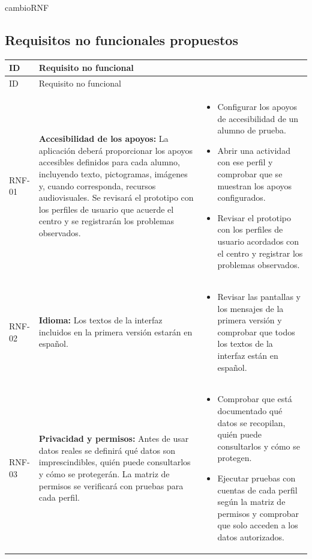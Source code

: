 \begin{cambiocontenido}{cambioRNF}
\subsection{Requisitos no funcionales propuestos}
\begingroup
\small
\begin{longtable}{|>{\raggedright\arraybackslash}p{1.4cm}|>{\raggedright\arraybackslash}p{5.5cm}|>{\raggedright\arraybackslash}p{7.8cm}|}
\hline
\rowcolor{tableHeader}
ID & Requisito no funcional & \multicolumn{1}{|>{\raggedright\arraybackslash}p{7.8cm}|}{Criterio de aceptación} \\
\hline
\endfirsthead
\rowcolor{tableHeader}
ID & Requisito no funcional & \multicolumn{1}{|>{\raggedright\arraybackslash}p{7.8cm}|}{Criterio de aceptación} \\
\hline
\endhead
\hypertarget{rnf-01}{}RNF-01 & \textbf{Accesibilidad de los apoyos:} La aplicación deberá proporcionar los apoyos accesibles definidos para cada alumno, incluyendo texto, pictogramas, imágenes y, cuando corresponda, recursos audiovisuales. Se revisará el prototipo con los perfiles de usuario que acuerde el centro y se registrarán los problemas observados. & \begin{itemize}[nosep,leftmargin=*]\item Configurar los apoyos de accesibilidad de un alumno de prueba. \item Abrir una actividad con ese perfil y comprobar que se muestran los apoyos configurados. \item Revisar el prototipo con los perfiles de usuario acordados con el centro y registrar los problemas observados.\end{itemize} \\
\hline
\hypertarget{rnf-02}{}RNF-02 & \textbf{Idioma:} Los textos de la interfaz incluidos en la primera versión estarán en español. & \begin{itemize}[nosep,leftmargin=*]\item Revisar las pantallas y los mensajes de la primera versión y comprobar que todos los textos de la interfaz están en español.\end{itemize} \\
\hline
\hypertarget{rnf-03}{}RNF-03 & \textbf{Privacidad y permisos:} Antes de usar datos reales se definirá qué datos son imprescindibles, quién puede consultarlos y cómo se protegerán. La matriz de permisos se verificará con pruebas para cada perfil. & \begin{itemize}[nosep,leftmargin=*]\item Comprobar que está documentado qué datos se recopilan, quién puede consultarlos y cómo se protegen. \item Ejecutar pruebas con cuentas de cada perfil según la matriz de permisos y comprobar que solo acceden a los datos autorizados.\end{itemize} \\

\end{longtable}
\end{cambiocontenido}

